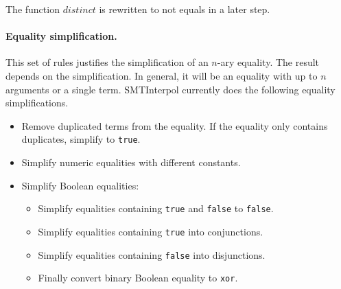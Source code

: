 \documentclass[a4paper]{article}
\newcommand\si{SMTInterpol\xspace}
\begin{document}
The function $distinct$ is rewritten to not equals in a later step.

\paragraph{Equality simplification.}
This set of rules justifies the simplification of an $n$-ary equality.  The
result depends on the simplification.  In general, it will be an equality with
up to $n$ arguments or a single term.  \si currently does the following
equality simplifications.
\begin{itemize}
\item Remove duplicated terms from the equality.  If the equality only
  contains duplicates, simplify to \verb+true+.
\item Simplify numeric equalities with different constants.
\item Simplify Boolean equalities:
  \begin{itemize}
  \item Simplify equalities containing \verb+true+ and \verb+false+ to
    \verb+false+.
  \item Simplify equalities containing \verb+true+ into conjunctions.
  \item Simplify equalities containing \verb+false+ into disjunctions.
  \item Finally convert binary Boolean equality to \verb+xor+.
  \end{itemize}
\end{itemize}
\end{document}
